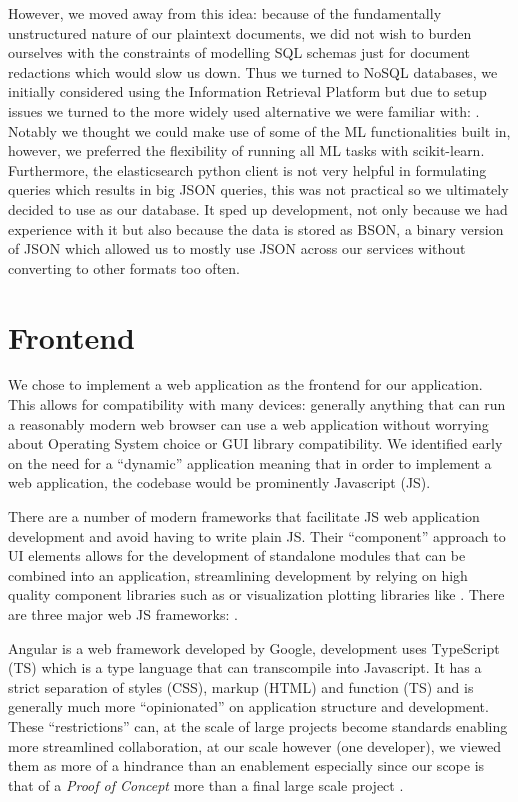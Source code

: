 \documentclass[\version]{l4proj}
\begin{document}
However, we moved away from this idea: because of the fundamentally unstructured nature of our plaintext documents, we did not wish to burden ourselves with the constraints of modelling SQL schemas just for document redactions which would slow us down.
Thus we turned to NoSQL databases, we initially considered using the \textcite{Terrier2020} Information Retrieval Platform but due to setup issues we turned to the more widely used alternative we were familiar with: \textcite{ElasticElasticsearch2020}.
Notably we thought we could make use of some of the ML functionalities built in, however, we preferred the flexibility of running all ML tasks with scikit-learn.
Furthermore, the elasticsearch python client is not very helpful in formulating queries which results in big JSON queries, this was not practical so we ultimately decided to use \textcite{MongoDB2020} as our database.
It sped up development, not only because we had experience with it but also because the data is stored as BSON, a binary version of JSON which allowed us to mostly use JSON across our services without converting to other formats too often.

\section{Frontend}

We chose to implement a web application as the frontend for our application.
This allows for compatibility with many devices: generally anything that can run a reasonably modern web browser can use a web application without worrying about Operating System choice or GUI library compatibility.
We identified early on the need for a ``dynamic'' application meaning that in order to implement a web application, the codebase would be prominently Javascript (JS).

There are a number of modern frameworks that facilitate JS web application development and avoid having to write plain JS.
Their ``component'' approach to UI elements allows for the development of standalone modules that can be combined into an application, streamlining development by relying on high quality component libraries such as \textcite{Materialui2020} or visualization plotting libraries like \textcite{Recharts2020}.
There are three major web JS frameworks: \textcite{Angular2020,FacebookReact2020,VuejsVue2020}.

Angular is a web framework developed by Google, development uses TypeScript (TS) which is a type language that can transcompile into Javascript.
It has a strict separation of styles (CSS), markup (HTML) and function (TS) and is generally much more ``opinionated'' on application structure and development.
These ``restrictions'' can, at the scale of large projects become standards enabling more streamlined collaboration, at our scale however (one developer), we viewed them as more of a hindrance than an enablement especially since our scope is that of a \textit{Proof of Concept} more than a final large scale project \autocite{wohlgethanSupportingWebDevelopmentDecisions2018}.
\end{document}
